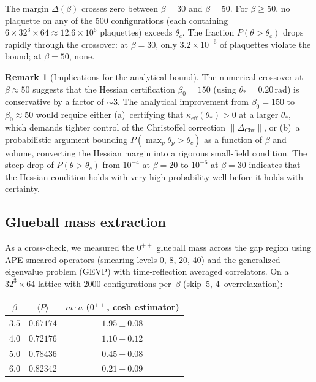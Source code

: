 \documentclass[11pt]{article}
\theoremstyle{definition}
\newtheorem{remark}[theorem]{Remark}
\begin{document}
The margin $\Delta(\beta)$ crosses zero between $\beta=30$ and
$\beta=50$.  For $\beta\ge 50$, no plaquette on any of the 500
configurations (each containing $6\times 32^3\times 64\approx
12.6\times 10^6$ plaquettes) exceeds $\theta_c$.
The fraction $P(\theta>\theta_c)$ drops rapidly through the
crossover: at $\beta=30$, only $3.2\times 10^{-6}$ of plaquettes
violate the bound; at $\beta=50$, none.

\begin{remark}[Implications for the analytical bound]
\label{rem:recon}
The numerical crossover at $\beta\approx 50$ suggests that the
Hessian certification $\beta_0=150$ (using $\theta_*=0.20$\,rad) is
conservative by a factor of ${\sim}3$.  The analytical improvement
from $\beta_0=150$ to $\beta_0\approx 50$ would require either
(a)~certifying that $\kappa_{\mathrm{eff}}(\theta_*)>0$ at a larger
$\theta_*$, which demands tighter control of the Christoffel
correction $\|\Delta_{\mathrm{Chr}}\|$, or (b)~a probabilistic
argument bounding $P(\max_p\theta_p>\theta_c)$ as a function of
$\beta$ and volume, converting the Hessian margin into a rigorous
small-field condition.  The steep drop of $P(\theta>\theta_c)$ from
$10^{-4}$ at $\beta=20$ to $10^{-6}$ at $\beta=30$ indicates that
the Hessian condition holds with very high probability well before
it holds with certainty.
\end{remark}

\subsection{Glueball mass extraction}

As a cross-check, we measured the $0^{++}$ glueball mass across
the gap region using APE-smeared operators (smearing levels 0, 8,
20, 40) and the generalized eigenvalue problem (GEVP) with
time-reflection averaged correlators.  On a $32^3\times 64$ lattice
with 2000 configurations per~$\beta$ (skip~5, 4~overrelaxation):

\begin{center}
\begin{tabular}{ccc}
\toprule
$\beta$ & $\langle P\rangle$ & $m\cdot a$ ($0^{++}$, cosh estimator)\\
\midrule
$3.5$ & $0.67174$ & $1.95\pm 0.08$\\
$4.0$ & $0.72176$ & $1.10\pm 0.12$\\
$5.0$ & $0.78436$ & $0.45\pm 0.08$\\
$6.0$ & $0.82342$ & $0.21\pm 0.09$\\
\bottomrule
\end{tabular}
\end{center}
\end{document}
